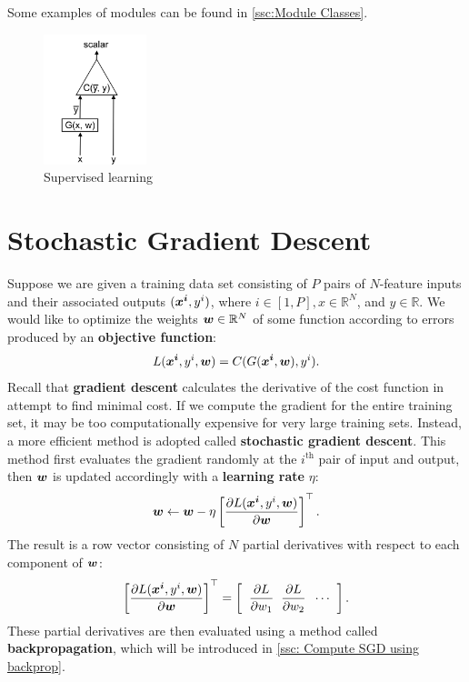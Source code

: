 Some examples of modules can be found in \cref{ssc:Module Classes}. 

\begin{figure}[ht]
\centering
\includegraphics[width=30mm]{lectures/01-b/supervised.png}
\caption{Supervised learning}
\label{fig:supervised}
\end{figure}

\section{Stochastic Gradient Descent}\label{sec: SGD}

Suppose we are given a training data set consisting of $P$ pairs of $N$-feature inputs and their associated outputs $(\bm{x^i}, y^i)$, where $i \in [1, P], x\in \mathbb{R}^N$, and $y\in \mathbb{R}$.
We would like to optimize the weights $\bm{w}\in \mathbb{R}^N$ of some function according to errors produced by an \textbf{objective function}:
\[
L(\bm{x^i}, y^i, \bm{w}) = C(G(\bm{x^i}, \bm{w}), y^i).
\]
Recall that \textbf{gradient descent} calculates the derivative of the cost function in attempt to find minimal cost.
If we compute the gradient for the entire training set, it may be too computationally expensive for very large training sets.
Instead, a more efficient method is adopted called \textbf{stochastic gradient descent}.
This method first evaluates the gradient randomly at the $i^\text{th}$ pair of input and output, then $\bm{w}$ is updated accordingly with a \textbf{learning rate} $\eta$:
\begin{equation}\label{eq: SGD}
\bm{w} \leftarrow \bm{w} - \eta \left[ \frac{\partial L(\bm{x^i}, y^i, \bm{w})}{\partial \bm{w}} \right]^\top.
\end{equation}
The result is a row vector consisting of $N$ partial derivatives with respect to each component of $\bm{w}$:
\[
\left[ \frac{\partial L(\bm{x^i}, y^i, \bm{w})}{\partial \bm{w}} \right]^\top = \left[ \hspace{2mm} \frac{\partial L}{\partial w_1} \hspace{2mm} \frac{\partial L}{\partial w_2} \hspace{2mm} \cdots \hspace{2mm} \right].
\]
These partial derivatives are then evaluated using a method called \textbf{backpropagation}, which will be introduced in \cref{ssc: Compute SGD using backprop}.

